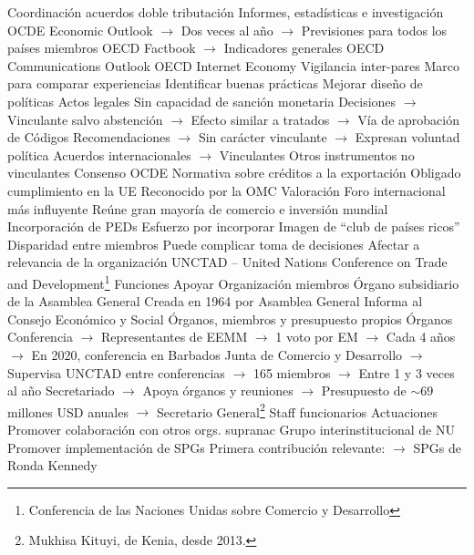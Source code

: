 \documentclass{nuevotema}
\begin{document}
\begin{esquemal}
				\4 Coordinación acuerdos doble tributación
				\4 Informes, estadísticas e investigación
				\4[] OCDE Economic Outlook
				\4[] $\to$ Dos veces al año
				\4[] $\to$ Previsiones para todos los países miembros
				\4[] OECD Factbook
				\4[] $\to$ Indicadores generales
				\4[] OECD Communications Outlook
				\4[] OECD Internet Economy
				\4 Vigilancia inter-pares
				\4[] Marco para comparar experiencias
				\4[] Identificar buenas prácticas
				\4[] Mejorar diseño de políticas
				\4 Actos legales
				\4[] Sin capacidad de sanción monetaria
				\4[] Decisiones
				\4[] $\to$ Vinculante salvo abstención
				\4[] $\to$ Efecto similar a tratados
				\4[] $\to$ Vía de aprobación de Códigos
				\4[] Recomendaciones
				\4[] $\to$ Sin carácter vinculante
				\4[] $\to$ Expresan voluntad política
				\4[] Acuerdos internacionales
				\4[] $\to$ Vinculantes
				\4[] Otros instrumentos no vinculantes
				\4 Consenso OCDE
				\4[] Normativa sobre créditos a la exportación
				\4[] Obligado cumplimiento en la UE
				\4[] Reconocido por la OMC
			\3 Valoración
				\4 Foro internacional más influyente
				\4 Reúne gran mayoría de comercio e inversión mundial
				\4 Incorporación de PEDs
				\4[] Esfuerzo por incorporar
				\4[] Imagen de ``club de países ricos''
				\4 Disparidad entre miembros
				\4[] Puede complicar toma de decisiones
				\4[] Afectar a relevancia de la organización
		\2 UNCTAD -- United Nations Conference on Trade and Development\footnote{Conferencia de las Naciones Unidas sobre Comercio y Desarrollo}
			\3 Funciones
				\4 Apoyar
			\3 Organización
				 miembros
				\4 Órgano subsidiario de la Asamblea General
				\4 Creada en 1964 por Asamblea General
				\4 Informa al Consejo Económico y Social
				\4 Órganos, miembros y presupuesto propios
				\4 Órganos
				\4[] Conferencia
				\4[] $\to$ Representantes de EEMM
				\4[] $\to$ 1 voto por EM
				\4[] $\to$ Cada 4 años
				\4[] $\to$ En 2020, conferencia en Barbados
				\4[] Junta de Comercio y Desarrollo
				\4[] $\to$ Supervisa UNCTAD entre conferencias
				\4[] $\to$ 165 miembros
				\4[] $\to$ Entre 1 y 3 veces al año
				\4[] Secretariado
				\4[] $\to$ Apoya órganos y reuniones
				\4[] $\to$ Presupuesto de $\sim 69$ millones USD anuales
				\4[] $\to$ Secretario General\footnote{Mukhisa Kituyi, de Kenia, desde 2013.}
				\4 Staff
				 funcionarios
			\3 Actuaciones
				\4 Promover colaboración con otros orgs. supranac
				\4[] Grupo interinstitucional de NU
				\4 Promover implementación de SPGs
				\4[] Primera contribución relevante:
				\4[] $\to$ SPGs de Ronda Kennedy

\end{esquemal}
\end{document}
